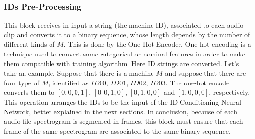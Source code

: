 \subsubsection{IDs Pre-Processing}
This block receives in input a string (the machine ID), associated to each audio clip and converts it to a binary sequence, whose length depends by the number of different kinds of $M$. This is done by the One-Hot Encoder. One-hot encoding is a technique used to convert some categorical or nominal features in order to make them compatible with training algorithm. Here ID strings are converted. Let's take an example. Suppose that there is a machine $M$ and suppose that there are four type of $M$, identified as $ID00$, $ID01$, $ID02$, $ID03$. The one-hot encoder converts them to $[0,0,0,1]$, $[0,0,1,0]$, $[0,1,0,0]$ and $[1,0,0,0]$, respectively. This operation arranges the IDs to be the input of the ID Conditioning Neural Network, better explained in the next sections. In conclusion, because of each audio file spectrogram is segmented in frames, this block must ensure that each frame of the same spectrogram are associated to the same binary sequence.
